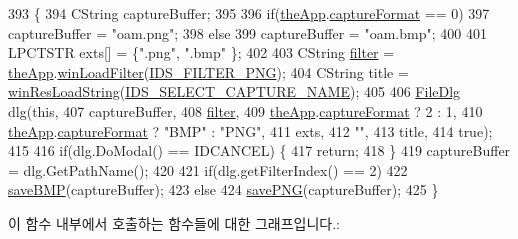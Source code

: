 \begin{DoxyCode}
393 \{
394   CString captureBuffer;
395 
396   \textcolor{keywordflow}{if}(\mbox{\hyperlink{_v_b_a_8cpp_a8095a9d06b37a7efe3723f3218ad8fb3}{theApp}}.\mbox{\hyperlink{class_v_b_a_a103f0b25433c57c4458a208a06799cf8}{captureFormat}} == 0)
397     captureBuffer = \textcolor{stringliteral}{"oam.png"};
398   \textcolor{keywordflow}{else}
399     captureBuffer = \textcolor{stringliteral}{"oam.bmp"};
400 
401   LPCTSTR exts[] = \{\textcolor{stringliteral}{".png"}, \textcolor{stringliteral}{".bmp"} \};
402 
403   CString \mbox{\hyperlink{_s_d_l_8cpp_af0122ee4312107103b580a98c74a4ea6}{filter}} = \mbox{\hyperlink{_v_b_a_8cpp_a8095a9d06b37a7efe3723f3218ad8fb3}{theApp}}.\mbox{\hyperlink{class_v_b_a_a228edf26b0dc4129658c174ee5a3c27c}{winLoadFilter}}(\mbox{\hyperlink{resource_8h_a374944c3928d8197bc2bbf9e85207a4d}{IDS\_FILTER\_PNG}});
404   CString title = \mbox{\hyperlink{_win_res_util_8cpp_a416e85e80ab9b01376e87251c83d1a5a}{winResLoadString}}(\mbox{\hyperlink{resource_8h_a10c24c77703afe57f6e641e939997cd2}{IDS\_SELECT\_CAPTURE\_NAME}});
405 
406   \mbox{\hyperlink{class_file_dlg}{FileDlg}} dlg(\textcolor{keyword}{this},
407               captureBuffer,
408               \mbox{\hyperlink{_s_d_l_8cpp_af0122ee4312107103b580a98c74a4ea6}{filter}},
409               \mbox{\hyperlink{_v_b_a_8cpp_a8095a9d06b37a7efe3723f3218ad8fb3}{theApp}}.\mbox{\hyperlink{class_v_b_a_a103f0b25433c57c4458a208a06799cf8}{captureFormat}} ? 2 : 1,
410               \mbox{\hyperlink{_v_b_a_8cpp_a8095a9d06b37a7efe3723f3218ad8fb3}{theApp}}.\mbox{\hyperlink{class_v_b_a_a103f0b25433c57c4458a208a06799cf8}{captureFormat}} ? \textcolor{stringliteral}{"BMP"} : \textcolor{stringliteral}{"PNG"},
411               exts,
412               \textcolor{stringliteral}{""},
413               title, 
414               \textcolor{keyword}{true});
415 
416   \textcolor{keywordflow}{if}(dlg.DoModal() == IDCANCEL) \{
417     \textcolor{keywordflow}{return};
418   \}
419   captureBuffer = dlg.GetPathName();
420 
421   \textcolor{keywordflow}{if}(dlg.getFilterIndex() == 2)
422     \mbox{\hyperlink{class_g_b_oam_view_a03a02a1b15d607e9891e58695dcfd7dc}{saveBMP}}(captureBuffer);
423   \textcolor{keywordflow}{else}
424     \mbox{\hyperlink{class_g_b_oam_view_a06b80040df2b94b034d5b0822ebc27ed}{savePNG}}(captureBuffer);  
425 \}
\end{DoxyCode}
이 함수 내부에서 호출하는 함수들에 대한 그래프입니다.\+:
\nopagebreak
